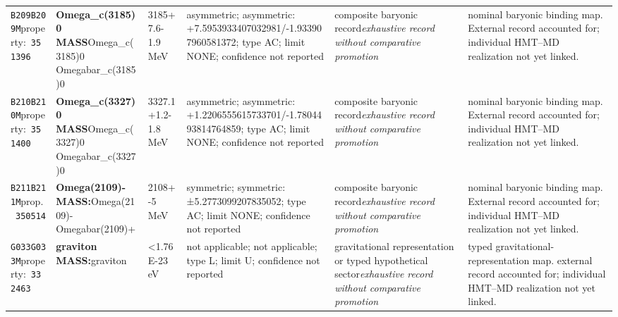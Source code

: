 \begin{landscape}
\begin{longtable}{L{1.85cm}L{4.45cm}L{2.35cm}L{4.05cm}L{3.35cm}L{7.15cm}}
\texttt{B209}\newline \texttt{B209M}\newline property:\ \texttt{351396} & \textbf{Omega\_\allowbreak{}c(3185)0 MASS}\newline Omega\_\allowbreak{}c(3185)0 \textbar{}\allowbreak{} Omegabar\_\allowbreak{}c(3185)0 & 3185+7.6-1.9\,MeV & asymmetric; asymmetric: +7.5953933407032981/-1.933907960581372; type AC; limit NONE; confidence not reported & composite baryonic record\newline \emph{exhaustive record without comparative promotion} & nominal baryonic binding map. External record accounted for; individual HMT--MD realization not yet linked. \\
\texttt{B210}\newline \texttt{B210M}\newline property:\ \texttt{351400} & \textbf{Omega\_\allowbreak{}c(3327)0 MASS}\newline Omega\_\allowbreak{}c(3327)0 \textbar{}\allowbreak{} Omegabar\_\allowbreak{}c(3327)0 & 3327.1+1.2-1.8\,MeV & asymmetric; asymmetric: +1.2206555615733701/-1.7804493814764859; type AC; limit NONE; confidence not reported & composite baryonic record\newline \emph{exhaustive record without comparative promotion} & nominal baryonic binding map. External record accounted for; individual HMT--MD realization not yet linked. \\
\texttt{B211}\newline \texttt{B211M}\newline prop.\ \texttt{350514} & \textbf{Omega(2109)- MASS:}\newline Omega(2109)- \textbar{}\allowbreak{} Omegabar(2109)+ & 2108+-5\,MeV & symmetric; symmetric: ±5.2773099207835052; type AC; limit NONE; confidence not reported & composite baryonic record\newline \emph{exhaustive record without comparative promotion} & nominal baryonic binding map. External record accounted for; individual HMT--MD realization not yet linked. \\
\texttt{G033}\newline \texttt{G033M}\newline property:\ \texttt{332463} & \textbf{graviton MASS:}\newline graviton & \textless{}1.76E-23\,eV & not applicable; not applicable; type L; limit U; confidence not reported & gravitational representation or typed hypothetical sector\newline \emph{exhaustive record without comparative promotion} & typed gravitational-representation map. external record accounted for; individual HMT--MD realization not yet linked. \\

\end{longtable}
\end{landscape}
